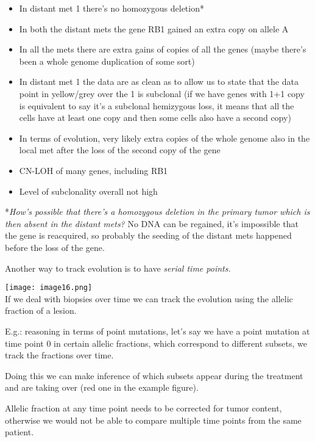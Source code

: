 \begin{itemize}
\item
  In distant met 1 there's no homozygous deletion*
\item
  In both the distant mets the gene RB1 gained an extra copy on allele A
\item
  In all the mets there are extra gains of copies of all the genes (maybe
  there's been a whole genome duplication of some sort)
\item
  In distant met 1 the data are as clean as to allow us to state that the data
  point in yellow/grey over the 1 is subclonal (if we have genes with 1+1 copy
  is equivalent to say it's a subclonal hemizygous loss, it means that all the
  cells have at least one copy and then some cells also have a second copy)
\item
  In terms of evolution, very likely extra copies of the whole genome also in
  the local met after the loss of the second copy of the gene
\item
  CN-LOH of many genes, including RB1
\item
  Level of subclonality overall not high
\end{itemize}

*\emph{How's possible that there's a homozygous deletion in the primary tumor
which is then absent in the distant mets?} No DNA can be regained, it's
impossible that the gene is reacquired, so probably the seeding of the distant
mets happened before the loss of the gene.

Another way to track evolution is to have \emph{serial time points.}

\texttt{[image: image16.png]}\\

If we deal with biopsies over time we can track the evolution using the allelic
fraction of a lesion.

E.g.: reasoning in terms of point mutations, let's say we have a point mutation
at time point 0 in certain allelic fractions, which correspond to different
subsets, we track the fractions over time.

Doing this we can make inference of which subsets appear during the treatment
and are taking over (red one in the example figure).

Allelic fraction at any time point needs to be corrected for tumor content,
otherwise we would not be able to compare multiple time points from the same
patient.
